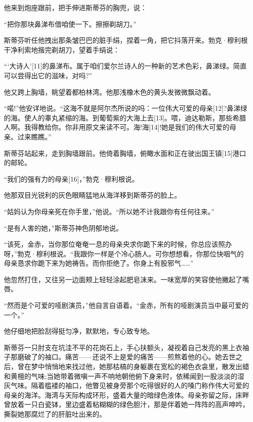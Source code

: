 \documentclass{article}
\begin{document}
他来到炮座跟前，把手伸进斯蒂芬的胸兜，说：



“把你那块鼻涕布借咱使一下。擦擦剃胡刀。”



斯蒂芬听任他拽出那条皱巴巴的脏手绢，捏着一角，把它抖落开来。勃克·穆利根干净利索地揩完剃胡刀，望着手绢说：



“‘大诗人’[11]的鼻涕布。属于咱们爱尔兰诗人的一种新的艺术色彩，鼻涕绿。简直可以尝得出它的滋味，对吗?”



他又跨上胸墙，眺望着都柏林湾。他那浅橡木色的黄头发微微飘动着。



“喏!”他安详地说。“这海不就是阿尔杰所说的吗：一位伟大可爱的母亲[12]?鼻涕绿的海。使人的睾丸紧缩的海。到葡萄紫的大海上去[13]。喂，迪达勒斯，那些希腊人啊。我得教给你。你非用原文来读不可。海!海[14]!她是我们的伟大可爱的母亲。过来瞧瞧。”



斯蒂芬站起来，走到胸墙跟前。他倚着胸墙，俯瞰水面和正在驶出国王镇[15]港口的邮轮。



“我们的强有力的母亲[16]，”勃克·穆利根说。



他那双目光锐利的灰色眼睛猛地从海洋移到斯蒂芬的脸上。



“姑妈认为你母亲死在你手里，”他说。“所以她不计我跟你有任何往来。”



“是有人害的她，”斯蒂芬神色阴郁地说。



“该死，金赤，当你那位奄奄一息的母亲央求你跪下来的时候，你总应该照办呀，”勃克·穆利根说。“我跟你一样是个冷心肠人。可你想想看，你那位快咽气的母亲恳求你跪下来为她祷告。而你拒绝了。你身上有股邪气……”



他忽然打住，又往另一边面颊上轻轻涂起肥皂沫来。一味宽厚的笑容使他撇起了嘴唇。



“然而是个可爱的哑剧演员，”他自言自语着。“金赤，所有的哑剧演员当中最可爱的一个。”



他仔细地把脸刮得挺匀净，默默地，专心致专地。



斯蒂芬一只肘支在坑洼不平的花岗石上，手心扶额头，凝视着自己发亮的黑上衣袖子那磨破了的袖口。痛苦——还说不上是爱的痛苦——煎熬着他的心。她去世之后，曾在梦中悄悄地来找过他，她那枯槁的身躯裹在宽松的褐色衣衾里，散发出蜡和黄檀的气味;当她带着微嗔一声不响地朝他俯下身来时，依稀闻到一股淡淡的湿灰气味。隔着槛褛的袖口，他瞥见被身旁那个吃得很好的人的嗓门称作伟大可爱的母亲的海洋。海湾与天际构成环形，盛着大量的暗绿色液体。母亲弥留之际，床畔曾放着一只白瓷钵，里边盛着粘糊糊的绿色胆汁，那是伴着她一阵阵的高声呻吟，撕裂她那腐烂了的肝脏吐出来的。
\end{document}
